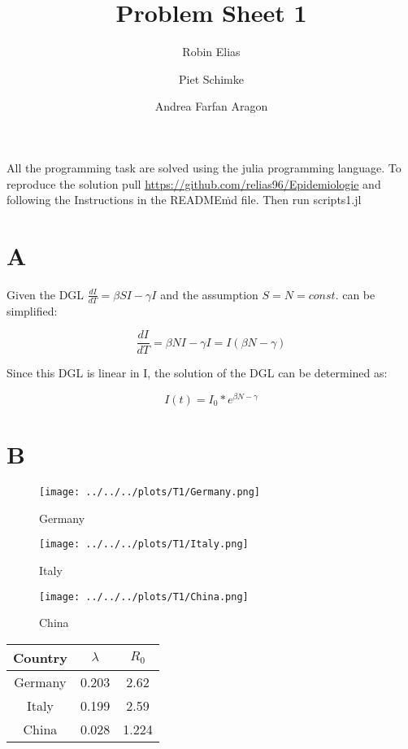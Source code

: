 \documentclass{article}
\title{Problem Sheet 1}
\author{Robin Elias \and Piet Schimke \and Andrea Farfan Aragon}
\date{}
\begin{document}
\maketitle
\begin{center}
    All the programming task are solved using the julia programming language.
    To reproduce the solution pull \href{https://github.com/relias96/Epidemiologie}{https://github.com/relias96/Epidemiologie} and following the Instructions in the README\.md file.
    Then run scripts\T1.jl
\end{center}
 
\section*{A}
Given the DGL $\frac{dI}{dT}=\beta SI- \gamma I $ and the assumption $S = N = const.$ can be simplified:

$$\frac{dI}{dT}=\beta NI- \gamma I = I(\beta N- \gamma)$$

Since this DGL is linear in I, the solution of the DGL can be determined as:

$$ I(t) = I_0 *e^{\beta N - \gamma}$$

\section*{B}



\begin{figure}[htbp]
    \centering
    \texttt{[image: ../../../plots/T1/Germany.png]}
    \caption{Germany}
    \label{fig:Germany}
\end{figure}

\begin{figure}[htbp]
    \centering
    \texttt{[image: ../../../plots/T1/Italy.png]}
    \caption{Italy}
    \label{fig:Italy}
\end{figure}

\begin{figure}[htbp]
    \centering
    \texttt{[image: ../../../plots/T1/China.png]}
    \caption{China}
    \label{fig:China}
\end{figure}


\begin{tabular}{|c|c|c|}
    \hline
    Country & $\lambda$ &$R_0$  \\
    \hline
    Germany &0.203     &2.62   \\
    Italy	 &0.199     &2.59   \\
    China	 &0.028     &1.224  \\
    \hline
\end{tabular}
\end{document}
